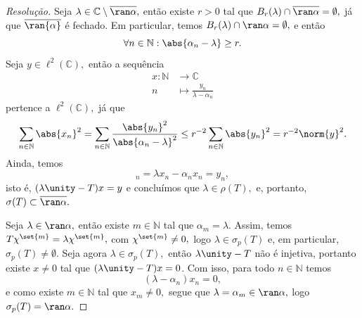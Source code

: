 \begin{proof}[Resolução]
  Seja \(\lambda \in \mathbb{C}\setminus\closure{\ran \alpha},\) então existe \(r > 0\) tal que \(B_r(\lambda) \cap \closure{\ran \alpha} = \emptyset,\) já que \(\closure{\ran{\alpha}}\) é fechado. Em particular, temos \(B_r(\lambda) \cap \ran \alpha = \emptyset,\) e então
  \begin{equation*}
    \forall n \in \mathbb{N} : \abs{\alpha_n - \lambda} \geq r.
  \end{equation*}
  Seja \(y \in \ell^2(\mathbb{C}),\) então a sequência
  \begin{align*}
    x : \mathbb{N} &\to \mathbb{C}\\
                 n &\mapsto \frac{y_n}{\lambda - \alpha_n}
  \end{align*}
  pertence a \(\ell^2(\mathbb{C}),\) já que
  \begin{equation*}
    \sum_{n \in \mathbb{N}}{\abs{x_n}^2} = \sum_{n \in \mathbb{N}}{\frac{\abs{y_n}^2}{\abs{\alpha_n - \lambda}^2}} \leq r^{-2} \sum_{n \in \mathbb{N}}{\abs{y_n}^2} = r^{-2} \norm{y}^2.
  \end{equation*}
  Ainda, temos
  \begin{equation*}
    [(\lambda \unity - T)x]_n = \lambda x_n - \alpha_n x_n = y_n,
  \end{equation*}
  isto é, \((\lambda \unity - T)x = y\) e concluímos que \(\lambda \in \rho(T),\) e, portanto, \(\sigma(T) \subset \closure{\ran \alpha}.\)

  Seja \(\lambda \in \ran\alpha,\) então existe \(m \in \mathbb{N}\) tal que \(\alpha_m = \lambda.\) Assim, temos \(T \chi^{\set{m}} = \lambda \chi^{\set{m}},\) com \(\chi^{\set{m}} \neq 0,\) logo \(\lambda \in \sigma_p(T)\) e, em particular, \(\sigma_p(T) \neq \emptyset.\) Seja agora \(\lambda \in \sigma_p(T),\) então \(\lambda \unity - T\) não é injetiva, portanto existe \(x \neq 0\) tal que \((\lambda \unity - T)x = 0\). Com isso, para todo \(n \in \mathbb{N}\) temos
  \begin{equation*}
    (\lambda - \alpha_n) x_n = 0,
  \end{equation*}
  e como existe \(m \in \mathbb{N}\) tal que \(x_m \neq 0,\) segue que \(\lambda = \alpha_m \in \ran \alpha,\) logo \(\sigma_p(T) = \ran \alpha.\)


\end{proof}
